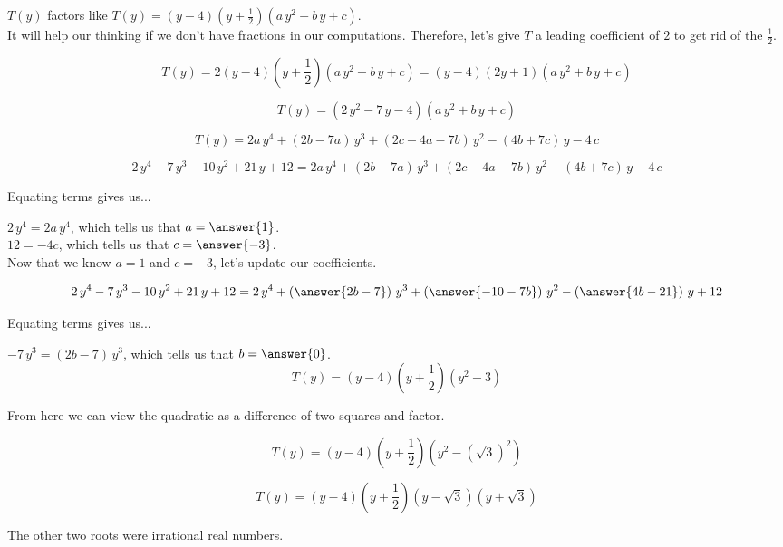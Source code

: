 \documentclass{ximera}
\begin{document}
\begin{explanation}



$T(y)$ factors like $T(y) = (y-4) \left(y+\frac{1}{2}\right) (a \, y^2 + b \, y + c)$. \\


It will help our thinking if we don't have fractions in our computations.  Therefore, let's give $T$ a leading coefficient of $2$ to get rid of the $\frac{1}{2}$.

\[
T(y) = 2 (y-4) \left(y+\frac{1}{2}\right) (a \, y^2 + b \, y + c) = (y-4) (2y+1) (a \, y^2 + b \, y + c)
\]


\[
T(y) = (2 \, y^2 - 7 \, y - 4) (a \, y^2 + b \, y + c)
\]




\[
T(y) = 2 a \, y^4 + (2 b - 7 a) \, y^3 + (2c - 4 a - 7 b) \, y^2 - (4 b + 7 c) \, y - 4 \, c
\]


\[
2\, y^4 - 7 \, y^3 - 10 \, y^2 + 21 \, y + 12 = 2 a \, y^4 + (2 b - 7 a) \, y^3 + (2 c - 4 a - 7 b) \, y^2 - (4 b + 7 c) \, y - 4 \, c
\]


Equating terms gives us...


$2 \, y^4 = 2 a \, y^4$, which tells us that $a = \answer{1}$. \\

$12 = -4 c$, which tells us that $c =  \answer{-3}$. \\



Now that we know $a = 1$ and $c = -3$, let's update our coefficients.


\[
2\, y^4 - 7 \, y^3 - 10 \, y^2 + 21 \, y + 12 = 2 \, y^4 + \left( \answer{2 b - 7 } \right) \, y^3 + \left( \answer{-10 - 7 b} \right) \, y^2 - \left( \answer{4 b - 21} \right) \, y + 12
\]




Equating terms gives us...


$-7 \, y^3 = (2 b - 7) \, y^3$, which tells us that $b = \answer{0}$. \\



\[
T(y) = (y-4) \left(y+\frac{1}{2}\right) (y^2  - 3)
\]


From here we can view the quadratic as a difference of two squares and factor. 



\[
T(y) = (y-4) \left(y+\frac{1}{2}\right) (y^2 - (\sqrt{3})^2)
\]



\[
T(y) = (y-4) \left(y+\frac{1}{2}\right) (y - \sqrt{3}) (y + \sqrt{3})
\]


The other two roots were irrational real numbers.


\end{explanation}
\end{document}
